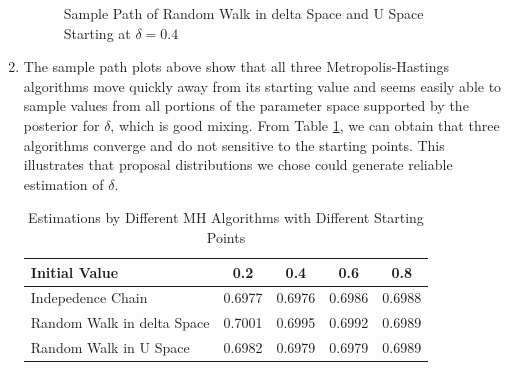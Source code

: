 \documentclass[11pt]{article}
\begin{document}
\begin{enumerate}
\begin{figure}[htbp]
        \caption{Sample Path of Random Walk in delta Space and U Space Starting at $\delta=0.4$}\label{fig:mhrw}
    \end{figure}  
    \item  The sample path plots above show that all three Metropolis-Hastings algorithms move quickly away from its starting value and seems easily able to sample values from all portions of the parameter space supported by the posterior for $\delta$, which is good mixing. From Table \ref{tab:mh}, we can obtain that three algorithms converge and do not sensitive to the starting points. This illustrates that proposal distributions we chose could generate reliable estimation of $\delta$.
    \begin{table}[htbp]
        \centering
        \caption{Estimations by Different MH Algorithms with Different Starting Points}\label{tab:mh}
        \begin{tabular}{lcccc} 
        \toprule
        Initial Value              & 0.2    & 0.4    & 0.6    & 0.8     \\ 
        \midrule
        Indepedence Chain          & 0.6977 & 0.6976 & 0.6986 & 0.6988  \\
        Random Walk in delta Space & 0.7001 & 0.6995 & 0.6992 & 0.6989  \\
        Random Walk in U Space     & 0.6982 & 0.6979 & 0.6979 & 0.6989  \\
        \bottomrule
        \end{tabular}
    \end{table}
\end{enumerate}
\end{document}
